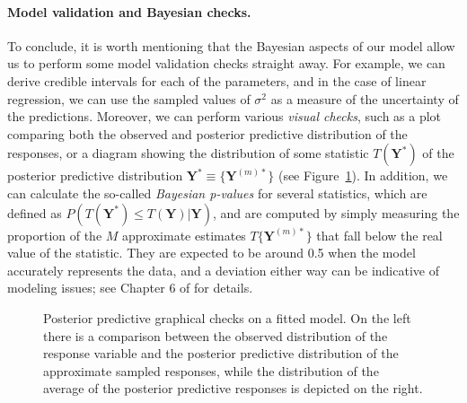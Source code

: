 \paragraph{Model validation and Bayesian checks.} To conclude, it is worth mentioning that the Bayesian aspects of our model allow us to perform some model validation checks straight away. For example, we can derive credible intervals for each of the parameters, and in the case of linear regression, we can use the sampled values of \(\sigma^2\) as a measure of the uncertainty of the predictions. Moreover, we can perform various \textit{visual checks}, such as a plot comparing both the observed and posterior predictive distribution of the responses, or a diagram showing the distribution of some statistic \(T(\symbf Y^*)\) of the posterior predictive distribution \(\symbf Y^* \equiv \{\symbf Y^{(m)*}\}\) (see Figure~\ref{fig:ppc}). In addition, we can calculate the so-called \textit{Bayesian p-values} for several statistics, which are defined as \(P(T(\symbf Y^*)\leq T(\symbf Y)| \symbf Y)\), and are computed by simply measuring the proportion of the \(M\) approximate estimates \(T\{\symbf Y^{(m)*}\}\) that fall below the real value of the statistic. They are expected to be around 0.5 when the model accurately represents the data, and a deviation either way can be indicative of modeling issues; see Chapter 6 of \citet{gelman2013bayesian} for details.

\begin{figure}[ht]
  \centering
  \caption{Posterior predictive graphical checks on a fitted model. On the left there is a comparison between the observed distribution of the response variable and the posterior predictive distribution of the approximate sampled responses, while the distribution of the average of the posterior predictive responses is depicted on the right.}\label{fig:ppc}
\end{figure}
